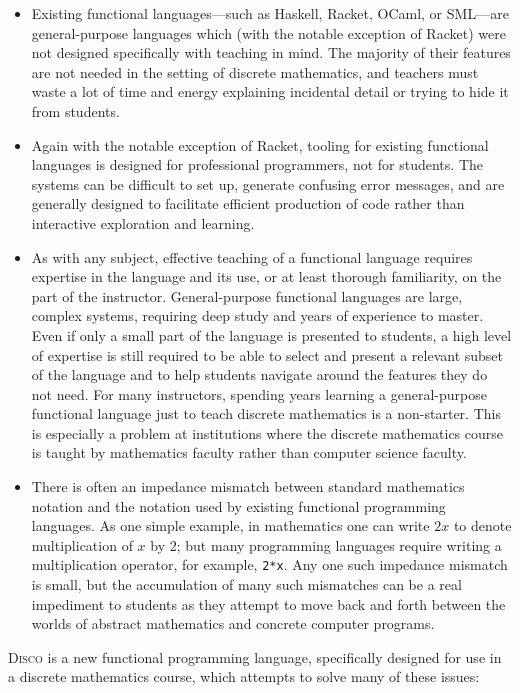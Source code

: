 \documentclass[submission,copyright,creativecommons]{eptcs}
\newcommand{\disco}{\textsc{Disco}\xspace}
\begin{document}
\begin{itemize}
\item Existing functional languages---such as Haskell, Racket, OCaml,
  or SML---are general-purpose languages which (with the notable
  exception of Racket) were not designed specifically with teaching in
  mind.  The majority of their features are not needed in the setting
  of discrete mathematics, and teachers must waste a lot of time and
  energy explaining incidental detail or trying to hide it from
  students.
\item Again with the notable exception of Racket, tooling for existing
  functional languages is designed for professional programmers, not
  for students.  The systems can be difficult to set up, generate
  confusing error messages, and are generally designed to facilitate
  efficient production of code rather than interactive exploration and
  learning.
\item As with any subject, effective teaching of a functional language
  requires expertise in the language and its use, or at least thorough
  familiarity, on the part of the instructor. General-purpose
  functional languages are large, complex systems, requiring deep
  study and years of experience to master.  Even if only a small part
  of the language is presented to students, a high level of expertise
  is still required to be able to select and present a relevant subset
  of the language and to help students navigate around the features
  they do not need.  For many instructors, spending years learning a
  general-purpose functional language just to teach discrete
  mathematics is a non-starter.  This is especially a problem at
  institutions where the discrete mathematics course is taught by
  mathematics faculty rather than computer science faculty.
\item There is often an impedance mismatch between standard
  mathematics notation and the notation used by existing functional
  programming languages.  As one simple example, in mathematics one
  can write $2x$ to denote multiplication of $x$ by $2$; but many
  programming languages require writing a multiplication operator, for
  example, \texttt{2*x}.  Any one such impedance mismatch is small,
  but the accumulation of many such mismatches can be a real
  impediment to students as they attempt to move back and forth
  between the worlds of abstract mathematics and concrete computer
  programs.
\end{itemize}

\disco is a new functional programming language, specifically designed
for use in a discrete mathematics course, which attempts to solve many
of these issues:
\end{document}
